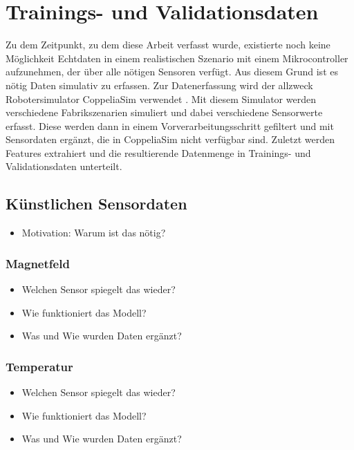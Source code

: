 \chapter{Trainings- und Validationsdaten}
Zu dem Zeitpunkt, zu dem diese Arbeit verfasst wurde, existierte noch keine Möglichkeit Echtdaten in einem
realistischen Szenario mit einem Mikrocontroller aufzunehmen, der über alle nötigen Sensoren verfügt.
Aus diesem Grund ist es nötig Daten simulativ zu erfassen.
\newline
\newline
Zur Datenerfassung wird der allzweck Robotersimulator CoppeliaSim verwendet \cite{coppeliaSim}.
Mit diesem Simulator werden verschiedene Fabrikszenarien simuliert und dabei verschiedene Sensorwerte erfasst.
Diese werden dann in einem Vorverarbeitungsschritt gefiltert und mit Sensordaten ergänzt, die in CoppeliaSim nicht verfügbar sind.
Zuletzt werden Features extrahiert und die resultierende Datenmenge in Trainings- und Validationsdaten unterteilt.



\section{Künstlichen Sensordaten}
\begin{itemize}
    \item Motivation: Warum ist das nötig?
\end{itemize}

\subsection{Magnetfeld}
\begin{itemize}
    \item Welchen Sensor spiegelt das wieder?
    \item Wie funktioniert das Modell?
    \item Was und Wie wurden Daten ergänzt?
\end{itemize}

\subsection{Temperatur}
\begin{itemize}
    \item Welchen Sensor spiegelt das wieder?
    \item Wie funktioniert das Modell?
    \item Was und Wie wurden Daten ergänzt?
\end{itemize}

